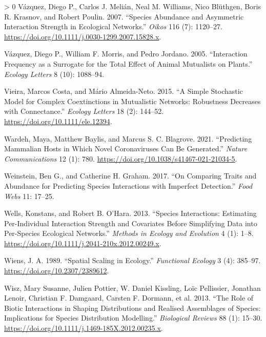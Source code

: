 \documentclass[11pt]{article}
\newlength{\cslhangindent}
\newenvironment{CSLReferences}[3] %
 {%
  \setlength{\parindent}{0pt}
  \ifodd #1 \everypar{\setlength{\hangindent}{\cslhangindent}}\ignorespaces\fi
  \ifnum #2 > 0
  \setlength{\parskip}{#2\baselineskip}
  \fi
 }%
 {}
\begin{document}
\begin{CSLReferences}{1}{0}
\leavevmode\hypertarget{ref-Vazquez2007SpeAbu}{}%
Vázquez, Diego P., Carlos J. Melián, Neal M. Williams, Nico Blüthgen,
Boris R. Krasnov, and Robert Poulin. 2007. {``Species Abundance and
Asymmetric Interaction Strength in Ecological Networks.''} \emph{Oikos}
116 (7): 1120--27.
\url{https://doi.org/10.1111/j.0030-1299.2007.15828.x}.

\leavevmode\hypertarget{ref-Vazquez2005IntFre}{}%
Vázquez, Diego P., William F. Morris, and Pedro Jordano. 2005.
{``Interaction Frequency as a Surrogate for the Total Effect of Animal
Mutualists on Plants.''} \emph{Ecology Letters} 8 (10): 1088--94.

\leavevmode\hypertarget{ref-Vieira2015SimSto}{}%
Vieira, Marcos Costa, and Mário Almeida-Neto. 2015. {``A Simple
Stochastic Model for Complex Coextinctions in Mutualistic Networks:
Robustness Decreases with Connectance.''} \emph{Ecology Letters} 18 (2):
144--52. \url{https://doi.org/10.1111/ele.12394}.

\leavevmode\hypertarget{ref-Wardeh2021PreMam}{}%
Wardeh, Maya, Matthew Baylis, and Marcus S. C. Blagrove. 2021.
{``Predicting Mammalian Hosts in Which Novel Coronaviruses Can Be
Generated.''} \emph{Nature Communications} 12 (1): 780.
\url{https://doi.org/10.1038/s41467-021-21034-5}.

\leavevmode\hypertarget{ref-Weinstein2017ComTra}{}%
Weinstein, Ben G., and Catherine H. Graham. 2017. {``On Comparing Traits
and Abundance for Predicting Species Interactions with Imperfect
Detection.''} \emph{Food Webs} 11: 17--25.

\leavevmode\hypertarget{ref-Wells2013SpeInt}{}%
Wells, Konstans, and Robert B. O'Hara. 2013. {``Species Interactions:
Estimating Per-Individual Interaction Strength and Covariates Before
Simplifying Data into Per-Species Ecological Networks.''} \emph{Methods
in Ecology and Evolution} 4 (1): 1--8.
\url{https://doi.org/10.1111/j.2041-210x.2012.00249.x}.

\leavevmode\hypertarget{ref-Wiens1989SpaSca}{}%
Wiens, J. A. 1989. {``Spatial Scaling in Ecology.''} \emph{Functional
Ecology} 3 (4): 385--97. \url{https://doi.org/10.2307/2389612}.

\leavevmode\hypertarget{ref-Wisz2013RolBio}{}%
Wisz, Mary Susanne, Julien Pottier, W. Daniel Kissling, Loïc Pellissier,
Jonathan Lenoir, Christian F. Damgaard, Carsten F. Dormann, et al. 2013.
{``The Role of Biotic Interactions in Shaping Distributions and Realised
Assemblages of Species: Implications for Species Distribution
Modelling.''} \emph{Biological Reviews} 88 (1): 15--30.
\url{https://doi.org/10.1111/j.1469-185X.2012.00235.x}.


\end{CSLReferences}
\end{document}
